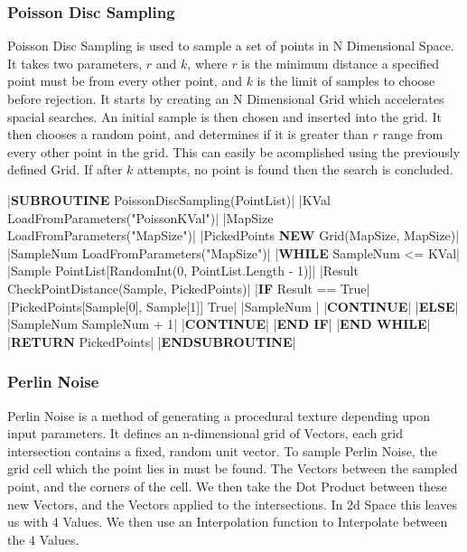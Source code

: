 \begin{flushleft}
                \vspace{0.5cm}
            \subsubsection{Poisson Disc Sampling}
                Poisson Disc Sampling is used to sample a set of points in N Dimensional Space. It takes two parameters, $r$ and $k$, where
                $r$ is the minimum distance a specified point must be from every other point, and $k$ is the limit of samples to choose
                before rejection. It starts by creating an N Dimensional Grid which accelerates spacial searches. An initial sample is then
                chosen and inserted into the grid. It then chooses a random point, and determines if it is greater than $r$ range from every 
                other point in the grid. This can easily be acomplished using the previously defined Grid. If after $k$ attempts, no point is
                found then the search is concluded.

                \vspace{0.2cm}
                \begin{pseudocode}
|\textbf{SUBROUTINE} PoissonDiscSampling(PointList)|
    |KVal \leftarrow LoadFromParameters("PoissonKVal")|
    |MapSize \leftarrow LoadFromParameters("MapSize")|
    |PickedPoints \leftarrow \textbf{NEW} Grid(MapSize, MapSize)|
    |SampleNum \leftarrow LoadFromParameters("MapSize")|
    |\textbf{WHILE} SampleNum <= KVal|
        |Sample \leftarrow PointList[RandomInt(0, PointList.Length - 1)]|
        |Result \leftarrow CheckPointDistance(Sample, PickedPoints)|
        |\textbf{IF} Result == True|
            |PickedPoints[Sample[0], Sample[1]] \leftarrow True|
            |SampleNum |
            |\textbf{CONTINUE}|
        |\textbf{ELSE}|
            |SampleNum \leftarrow SampleNum + 1|
            |\textbf{CONTINUE}|
        |\textbf{END IF}|
    |\textbf{END WHILE}|
    |\textbf{RETURN} PickedPoints|
|\textbf{ENDSUBROUTINE}|
                \end{pseudocode}
                
                \vspace{0.5cm}
            \subsubsection{Perlin Noise}
                Perlin Noise is a method of generating a procedural texture depending upon input parameters. It defines an n-dimensional
                grid of Vectors, each grid intersection contains a fixed, random unit vector. To sample Perlin Noise, the grid cell which
                the point lies in must be found. The Vectors between the sampled point, and the corners of the cell. We then take the Dot
                Product between these new Vectors, and the Vectors applied to the intersections. In 2d Space this leaves us with 4 Values.
                We then use an Interpolation function to Interpolate between the 4 Values. 
            

\end{flushleft}
